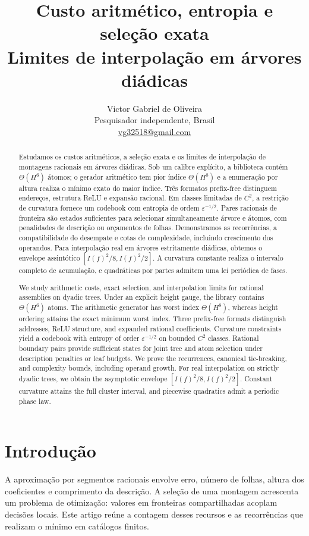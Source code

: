 \documentclass[11pt,a4paper]{article}
\title{\vspace{-12mm}\bfseries Custo aritmético, entropia e seleção exata\\[3pt]\large Limites de interpolação em árvores diádicas}
\author{Victor Gabriel de Oliveira\\\small Pesquisador independente, Brasil\\\small\href{mailto:vg32518@gmail.com}{vg32518@gmail.com}}
\date{}
\theoremstyle{definition}
\theoremstyle{remark}
\begin{document}
\maketitle\thispagestyle{plain}
\begin{abstract}Estudamos os custos aritméticos, a seleção exata e os limites de interpolação de montagens racionais em árvores diádicas. Sob um calibre explícito, a biblioteca contém $\Theta(H^6)$ átomos; o gerador aritmético tem pior índice $\Theta(H^8)$ e a enumeração por altura realiza o mínimo exato do maior índice. Três formatos prefix-free distinguem endereços, estrutura ReLU e expansão racional. Em classes limitadas de $C^2$, a restrição de curvatura fornece um codebook com entropia de ordem $\varepsilon^{-1/2}$. Pares racionais de fronteira são estados suficientes para selecionar simultaneamente árvore e átomos, com penalidades de descrição ou orçamentos de folhas. Demonstramos as recorrências, a compatibilidade do desempate e cotas de complexidade, incluindo crescimento dos operandos. Para interpolação real em árvores estritamente diádicas, obtemos o envelope assintótico $[I(f)^2/8,I(f)^2/2]$. A curvatura constante realiza o intervalo completo de acumulação, e quadráticas por partes admitem uma lei periódica de fases.\end{abstract}
\renewcommand{\abstractname}{Abstract}
\begin{abstract}We study arithmetic costs, exact selection, and interpolation limits for rational assemblies on dyadic trees. Under an explicit height gauge, the library contains $\Theta(H^6)$ atoms. The arithmetic generator has worst index $\Theta(H^8)$, whereas height ordering attains the exact minimum worst index. Three prefix-free formats distinguish addresses, ReLU structure, and expanded rational coefficients. Curvature constraints yield a codebook with entropy of order $\varepsilon^{-1/2}$ on bounded $C^2$ classes. Rational boundary pairs provide sufficient states for joint tree and atom selection under description penalties or leaf budgets. We prove the recurrences, canonical tie-breaking, and complexity bounds, including operand growth. For real interpolation on strictly dyadic trees, we obtain the asymptotic envelope $[I(f)^2/8,I(f)^2/2]$. Constant curvature attains the full cluster interval, and piecewise quadratics admit a periodic phase law.\end{abstract}
\section{Introdução}
A aproximação por segmentos racionais envolve erro, número de folhas, altura dos coeficientes e comprimento da descrição. A seleção de uma montagem acrescenta um problema de otimização: valores em fronteiras compartilhadas acoplam decisões locais. Este artigo reúne a contagem desses recursos e as recorrências que realizam o mínimo em catálogos finitos.
\end{document}
